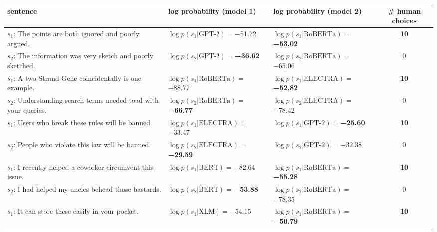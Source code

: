 \begin{tabularx}{\textwidth}{lllc}
\toprule
                                                           sentence &                               log probability (model 1) &                               log probability (model 2) &   \# human choices \\
\midrule
              $s_1$: The points are both ignored and poorly argued. &             $\log p(s_1 | \textrm{GPT-2})=$\num{-51.72} &  $\log p(s_1 | \textrm{RoBERTa})=$\textbf{\num{-53.02}} &  \textbf{\num{10}} \\
        $s_2$: The information was very sketch and poorly sketched. &    $\log p(s_2 | \textrm{GPT-2})=$\textbf{\num{-36.62}} &           $\log p(s_2 | \textrm{RoBERTa})=$\num{-65.06} &            \num{0} \\\midrule
            $s_1$: A two Strand Gene coincidentally is one example. &           $\log p(s_1 | \textrm{RoBERTa})=$\num{-88.77} &  $\log p(s_1 | \textrm{ELECTRA})=$\textbf{\num{-52.82}} &  \textbf{\num{10}} \\
   $s_2$: Understanding search terms needed toad with your queries. &  $\log p(s_2 | \textrm{RoBERTa})=$\textbf{\num{-66.77}} &           $\log p(s_2 | \textrm{ELECTRA})=$\num{-78.42} &            \num{0} \\\midrule
                 $s_1$: Users who break these rules will be banned. &           $\log p(s_1 | \textrm{ELECTRA})=$\num{-33.47} &    $\log p(s_1 | \textrm{GPT-2})=$\textbf{\num{-25.60}} &  \textbf{\num{10}} \\
                 $s_2$: People who violate this law will be banned. &  $\log p(s_2 | \textrm{ELECTRA})=$\textbf{\num{-29.59}} &             $\log p(s_2 | \textrm{GPT-2})=$\num{-32.38} &            \num{0} \\\midrule
         $s_1$: I recently helped a coworker circumvent this issue. &              $\log p(s_1 | \textrm{BERT})=$\num{-82.64} &  $\log p(s_1 | \textrm{RoBERTa})=$\textbf{\num{-55.28}} &  \textbf{\num{10}} \\
               $s_2$: I had helped my uncles behead those bastards. &     $\log p(s_2 | \textrm{BERT})=$\textbf{\num{-53.88}} &           $\log p(s_2 | \textrm{RoBERTa})=$\num{-78.35} &            \num{0} \\\midrule
                   $s_1$: It can store these easily in your pocket. &               $\log p(s_1 | \textrm{XLM})=$\num{-54.15} &  $\log p(s_1 | \textrm{RoBERTa})=$\textbf{\num{-50.79}} &  \textbf{\num{10}} \\

\end{tabularx}
